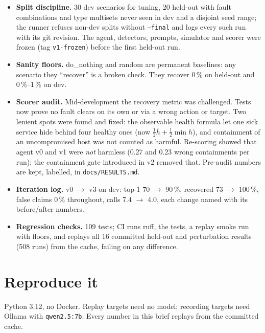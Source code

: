 \documentclass[11pt,a4paper]{article}
\newcommand{\code}[1]{\texttt{#1}}
\newcommand{\pct}[1]{#1\,\%}
\begin{document}
\begin{itemize}
  \item \textbf{Split discipline.} 30 dev scenarios for tuning, 20 held-out with fault combinations
        and type multisets never seen in dev and a disjoint seed range; the runner refuses non-dev
        splits without \code{--final} and logs every such run with its git revision. The agent, detectors,
        prompts, simulator and scorer were frozen (tag \code{v1-frozen}) before the first held-out run.
  \item \textbf{Sanity floors.} do\_nothing and random are permanent baselines: any scenario they
        ``recover'' is a broken check. They recover \pct{0} on held-out and \pct{0}--\pct{1} on dev.
  \item \textbf{Scorer audit.} Mid-development the recovery metric was challenged. Tests now prove
        no fault clears on its own or via a wrong action or target. Two lenient spots were
        found and fixed: the observable health formula let one sick service hide behind four healthy
        ones (now $\tfrac12\overline{h}+\tfrac12\min h$), and containment of an uncompromised host was
        not counted as harmful. Re-scoring showed that agent v0 and v1 were \emph{not} harmless
        (0.27 and 0.23 wrong containments per run); the containment gate introduced in v2 removed that.
        Pre-audit numbers are kept, labelled, in \code{docs/RESULTS.md}.
  \item \textbf{Iteration log.} v0 $\to$ v3 on dev: top-1 70 $\to$ 90\,\%, recovered 73 $\to$ 100\,\%,
        false claims 0\,\% throughout, calls 7.4 $\to$ 4.0, each change named with its before/after numbers.
  \item \textbf{Regression checks.} 109 tests; CI runs ruff, the tests, a replay smoke run with
        floors, and replays all 16 committed held-out and perturbation results (508 runs) from the
        cache, failing on any difference.
\end{itemize}

\section{Reproduce it}
\label{sec:repro}

Python 3.12, no Docker. Replay targets need no model; recording targets need Ollama with
\code{qwen2.5:7b}. Every number in this brief replays from the committed cache.
\end{document}
